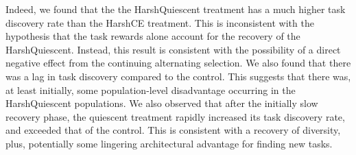 \documentclass[10pt,letterpaper,final]{article}
\begin{document}
Indeed, we found that the the HarshQuiescent treatment has a much higher task discovery rate than the HarshCE treatment. This is inconsistent with the hypothesis that the task rewards alone account for the recovery of the HarshQuiescent. Instead, this result is consistent with the possibility of a direct negative effect from the continuing alternating selection. We also found that there was a lag in task discovery compared to the control. This suggests that there was, at least initially, some population-level disadvantage occurring in the HarshQuiescent populations. We also observed that after the initially slow recovery phase, the quiescent treatment rapidly increased its task discovery rate, and exceeded that of the control. This is consistent with a recovery of diversity, plus, potentially some lingering architectural advantage for finding new tasks.

\end{document}
